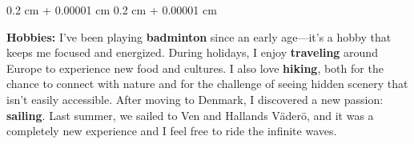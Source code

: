 \documentclass[10pt, letterpaper]{article}
\newenvironment{onecolentry}{
    \begin{adjustwidth}{
        0.2 cm + 0.00001 cm
    }{
        0.2 cm + 0.00001 cm
    }
}{
    \end{adjustwidth}
} %
\begin{document}
        \vspace{0.2 cm}

        \begin{onecolentry}
            \textbf{Hobbies:} 
            I’ve been playing \textbf{badminton} since an early age—it’s a hobby that keeps me focused and energized. During holidays, I enjoy \textbf{traveling} around Europe to experience new food and cultures. I also love \textbf{hiking}, both for the chance to connect with nature and for the challenge of seeing hidden scenery that isn’t easily accessible. After moving to Denmark, I discovered a new passion: \textbf{sailing}. Last summer, we sailed to Ven and Hallands Väderö, and it was a completely new experience and  I feel free to ride the infinite waves.
        \end{onecolentry}


    
\end{document}
